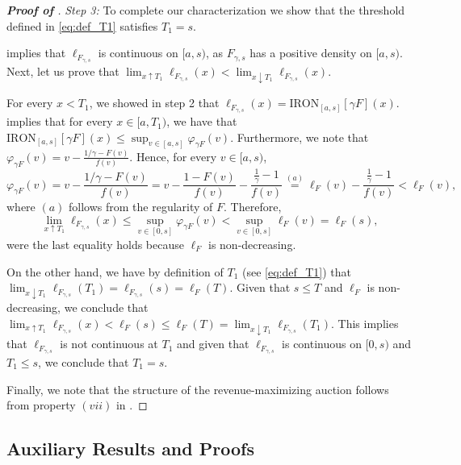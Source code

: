 \begin{proof}[\textbf{Proof of }]
\textit{Step 3:} To complete our characterization we show that the threshold defined in \eqref{eq:def_T1} satisfies $T_1 = s$. 

  implies that $\ell_{F_{\gamma,s}}$ is continuous on $[a,s)$, as $F_{\gamma,s}$ has a positive density on $[a,s)$.
Next, let us prove that $\lim_{x \uparrow T_1} \ell_{F_{\gamma,s}}(x) < \lim_{x \downarrow T_1} \ell_{F_{\gamma,s}}(x)$.

For every $x < T_1$, we showed in step 2 that $\ell_{F_{\gamma,s}}(x) = \mathrm{IRON}_{[a,s]}[\gamma F](x)$.   implies that for every $x \in [a,T_1)$, we have that $\mathrm{IRON}_{[a,s]}[\gamma F](x) \leq \sup_{v \in [a,s]} \varphi_{\gamma F}(v)$. Furthermore, we note that $\varphi_{\gamma F}(v) = v - \frac{1/\gamma-F(v)}{f(v)}$. Hence, for every $v \in [a,s)$,
\begin{equation*}
    \varphi_{\gamma F}(v) = v - \frac{1/\gamma-F(v)}{f(v)} = v - \frac{1-F(v)}{f(v)} - \frac{\frac{1}{\gamma}-1}{f(v)}\stackrel{(a)}{=} \ell_{F}(v) -  \frac{\frac{1}{\gamma}-1}{f(v)} < \ell_{F}(v),
\end{equation*}
where $(a)$ follows from the regularity of $F$. Therefore,
\begin{equation*}
\lim_{x \uparrow T_1} \ell_{F_{\gamma,s}}(x) \leq \sup_{v \in [0,s]} \varphi_{\gamma F}(v) <  \sup_{v \in [0,s]} \ell_{F}(v) = \ell_{F}(s),
\end{equation*}
were the last equality holds because $\ell_F$ is non-decreasing.

On the other hand, we have by definition of $T_1$ (see \eqref{eq:def_T1}) that $\lim_{x \downarrow T_1} \ell_{F_{\gamma,s}}(T_1) = \ell_{F_{\gamma,s}}(s) = \ell_{F}(T)$. Given that $s \leq T$ and $\ell_F$ is non-decreasing, we conclude that $\lim_{x \uparrow T_1} \ell_{F_{\gamma,s}}(x) < \ell_{F}(s) \leq \ell_{F}(T) = \lim_{x \downarrow T_1} \ell_{F_{\gamma,s}}(T_1)$. This implies that $\ell_{F_{\gamma,s}}$ is not continuous at $T_1$ and given that $\ell_{F_{\gamma,s}}$ is continuous on $[0,s)$ and $T_1 \leq s$, we conclude that $T_1 =s$.

Finally, we note that the structure of the revenue-maximizing auction follows from property $(vii)$ in .
\end{proof}


\subsection{Auxiliary Results and Proofs}

